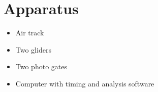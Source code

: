 \section*{Apparatus}

\begin{itemize}
    \item Air track
    \item Two gliders
    \item Two photo gates
    \item Computer with timing and analysis software
\end{itemize}